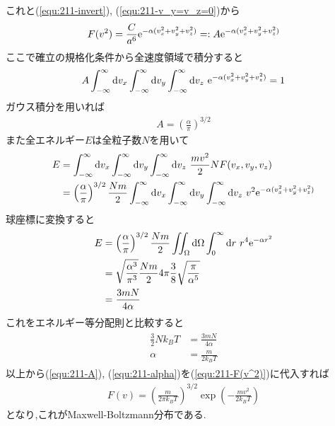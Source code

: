これと(\ref{equ:211-invert}), (\ref{equ:211-v_y=v_z=0})から
\begin{align}
  \label{equ:211-F(v^2)}
  F(v^2)=\frac{C}{a^6}{\rm e}^{-\alpha(v_x^2+v_y^2+v_z^2)}=:A{\rm e}^{-\alpha(v_x^2+v_y^2+v_z^2)}
\end{align}
ここで確立の規格化条件から全速度領域で積分すると
\begin{align}
  A\int_{-\infty}^\infty{\rm d}v_x\int_{-\infty}^\infty{\rm d}v_y\int_{-\infty}^\infty{\rm d}v_z\ {\rm e}^{-\alpha(v_x^2+v_y^2+v_z^2)}&=1\\
\end{align}
ガウス積分を用いれば
\begin{align}
  \label{equ:211-A}
  A=\left(\frac{\alpha}{\pi}\right)^{3/2}
\end{align}
また全エネルギー$E$は全粒子数$N$を用いて
\begin{align}
  \begin{split}
    E&=\int_{-\infty}^\infty{\rm d}v_x\int_{-\infty}^\infty{\rm d}v_y\int_{-\infty}^\infty{\rm d}v_z\ \frac{mv^2}{2}NF(v_x,v_y,v_z)\\
    &=\left(\frac{\alpha}{\pi}\right)^{3/2}\frac{Nm}{2}\int_{-\infty}^\infty{\rm d}v_x\int_{-\infty}^\infty{\rm d}v_y\int_{-\infty}^\infty{\rm d}v_z\ v^2{\rm e}^{-\alpha(v_x^2+v_y^2+v_z^2)}
  \end{split}
\end{align}
球座標に変換すると
\begin{align}
  \begin{split}
    E&=\left(\frac{\alpha}{\pi}\right)^{3/2}\frac{Nm}{2}\iint_\Omega{\rm d}\Omega\int_0^\infty{\rm d}r\ r^4{\rm e}^{-\alpha r^2}\\
    &=\sqrt{\frac{\alpha^3}{\pi^3}}\frac{Nm}{2}4\pi\frac{3}{8}\sqrt{\frac{\pi}{\alpha^5}}\\
    &=\frac{3mN}{4\alpha}
  \end{split}
\end{align}
これをエネルギー等分配則と比較すると
\begin{align}
  \label{equ:211-alpha}
  \begin{split}
    \frac{3}{2}Nk_BT&=\frac{3mN}{4\alpha}\\
    \alpha&=\frac{m}{2k_BT}
  \end{split}
\end{align}
以上から(\ref{equ:211-A}), (\ref{equ:211-alpha})を(\ref{equ:211-F(v^2)})に代入すれば
\begin{align}
  F(v)=\left(\frac{m}{2\pi k_BT}\right)^{3/2}\exp\left(-\frac{mv^2}{2k_BT}\right)
\end{align}
となり,これがMaxwell-Boltzmann分布である.\cite{std02pdf3:online}
